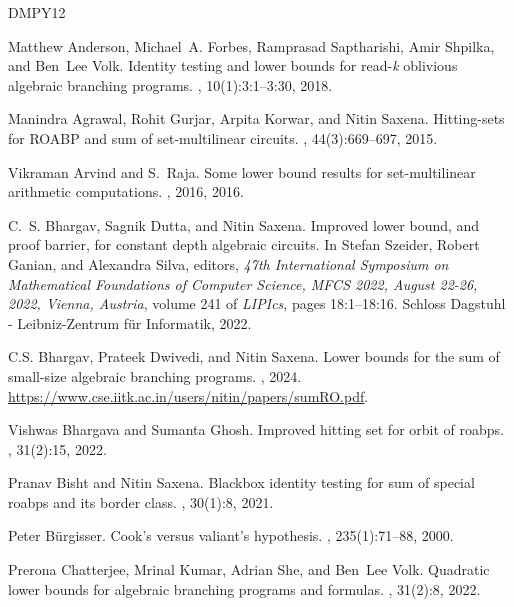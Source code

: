 \documentclass[10pt,a4paper]{article}
\theoremstyle{definition}%
\theoremstyle{plain}
\begin{document}
\newcommand{\etalchar}[1]{$^{#1}$}
\begin{thebibliography}{DMPY12}

\bibitem[AFS{\etalchar{+}}18]{AndersonFSSV18}
Matthew Anderson, Michael~A. Forbes, Ramprasad Saptharishi, Amir Shpilka, and
  Ben~Lee Volk.
\newblock Identity testing and lower bounds for read-\emph{k} oblivious
  algebraic branching programs.
, 10(1):3:1--3:30, 2018.

Manindra Agrawal, Rohit Gurjar, Arpita Korwar, and Nitin Saxena.
\newblock Hitting-sets for {ROABP} and sum of set-multilinear circuits.
, 44(3):669--697, 2015.

Vikraman Arvind and S.~Raja.
\newblock Some lower bound results for set-multilinear arithmetic computations.
, 2016, 2016.

C.~S. Bhargav, Sagnik Dutta, and Nitin Saxena.
\newblock Improved lower bound, and proof barrier, for constant depth algebraic
  circuits.
\newblock In Stefan Szeider, Robert Ganian, and Alexandra Silva, editors, {\em
  47th International Symposium on Mathematical Foundations of Computer Science,
  {MFCS} 2022, August 22-26, 2022, Vienna, Austria}, volume 241 of {\em
  LIPIcs}, pages 18:1--18:16. Schloss Dagstuhl - Leibniz-Zentrum f{\"{u}}r
  Informatik, 2022.

C.S. Bhargav, Prateek Dwivedi, and Nitin Saxena.
\newblock Lower bounds for the sum of small-size algebraic branching programs.
, 2024.
\newblock \url{https://www.cse.iitk.ac.in/users/nitin/papers/sumRO.pdf}.

Vishwas Bhargava and Sumanta Ghosh.
\newblock Improved hitting set for orbit of roabps.
, 31(2):15, 2022.

Pranav Bisht and Nitin Saxena.
\newblock Blackbox identity testing for sum of special roabps and its border
  class.
, 30(1):8, 2021.

Peter B{\"{u}}rgisser.
\newblock Cook's versus valiant's hypothesis.
, 235(1):71--88, 2000.

Prerona Chatterjee, Mrinal Kumar, Adrian She, and Ben~Lee Volk.
\newblock Quadratic lower bounds for algebraic branching programs and formulas.
, 31(2):8, 2022.


\end{thebibliography}
\end{document}
